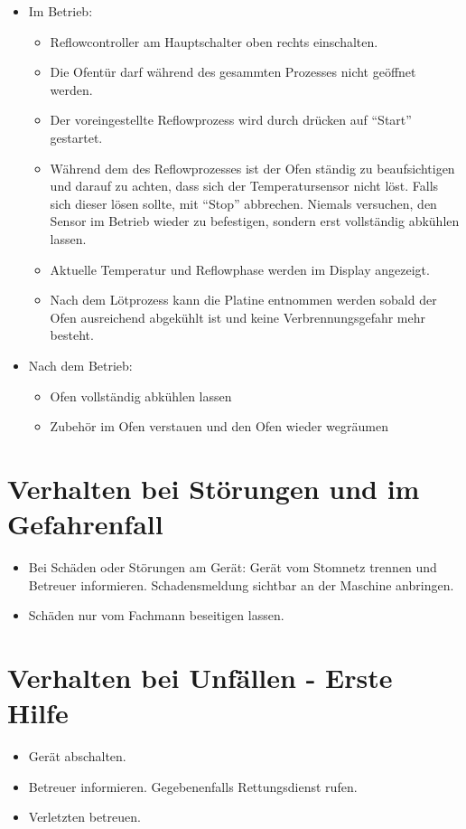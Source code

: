 \documentclass[fontsize=9pt]{scrartcl}
\newenvironment{smallitemize}{\begin{itemize}\itemsep -3pt}{\end{itemize}}
\begin{document}
\begin{itemize}
\begin{smallitemize}
	\end{smallitemize}
	\item Im Betrieb:
	\begin{smallitemize}
		\item Reflowcontroller am Hauptschalter oben rechts einschalten.
		\item Die Ofentür darf während des gesammten Prozesses nicht geöffnet werden.
		\item Der voreingestellte Reflowprozess wird durch drücken auf \enquote{Start} gestartet.
		\item Während dem des Reflowprozesses ist der Ofen ständig zu beaufsichtigen und darauf zu achten, dass sich der Temperatursensor nicht löst. Falls sich dieser lösen sollte, mit \enquote{Stop} abbrechen. Niemals versuchen, den Sensor im Betrieb wieder zu befestigen, sondern erst vollständig abkühlen lassen.
		\item Aktuelle Temperatur und Reflowphase werden im Display angezeigt.
		\item Nach dem Lötprozess kann die Platine entnommen werden sobald der Ofen ausreichend abgekühlt ist und keine Verbrennungsgefahr mehr besteht.
		\end{smallitemize}
	\item Nach dem Betrieb:
	\begin{smallitemize}
		\item Ofen vollständig abkühlen lassen
		\item Zubehör im Ofen verstauen und den Ofen wieder wegräumen
	\end{smallitemize}

\end{itemize}

\section{Verhalten bei Störungen und im Gefahrenfall}
\begin{smallitemize}
	\item Bei Schäden oder Störungen am Gerät: Gerät vom Stomnetz trennen und Betreuer informieren. Schadensmeldung sichtbar an der Maschine anbringen.
	\item Schäden nur vom Fachmann beseitigen lassen.
\end{smallitemize}

\section{Verhalten bei Unfällen - Erste Hilfe}
\begin{smallitemize}
	\item Gerät abschalten. 
	\item Betreuer informieren. Gegebenenfalls Rettungsdienst rufen.
	\item Verletzten betreuen.
\end{smallitemize}
\end{document}
